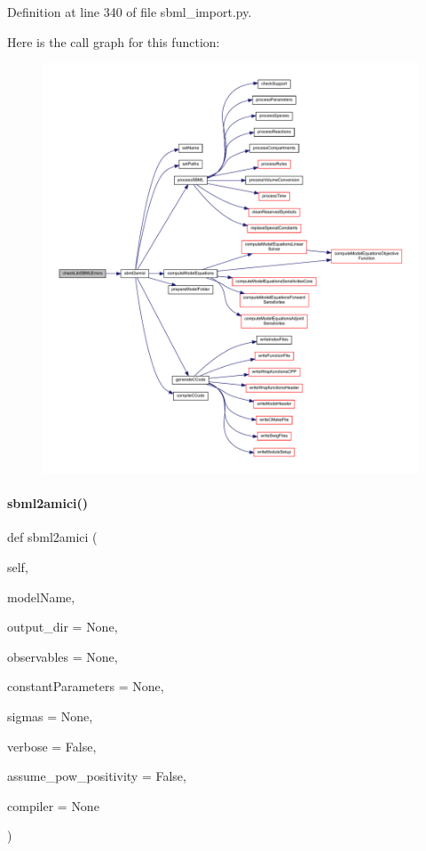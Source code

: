 Definition at line 340 of file sbml\+\_\+import.\+py.

Here is the call graph for this function\+:
\nopagebreak
\begin{figure}[H]
\begin{center}
\leavevmode
\includegraphics[width=350pt]{classamici_1_1sbml__import_1_1_sbml_importer_a0dcfa882a6a14f2d4b83e11552aae318_cgraph}
\end{center}
\end{figure}
\mbox{\label{classamici_1_1sbml__import_1_1_sbml_importer_a83900bb62c0121eb798939a6d4232a9c}} 
\paragraph{\texorpdfstring{sbml2amici()}{sbml2amici()}}
{\footnotesize\ttfamily def sbml2amici (\begin{DoxyParamCaption}\item[{}]{self,  }\item[{}]{model\+Name,  }\item[{}]{output\+\_\+dir = {\ttfamily None},  }\item[{}]{observables = {\ttfamily None},  }\item[{}]{constant\+Parameters = {\ttfamily None},  }\item[{}]{sigmas = {\ttfamily None},  }\item[{}]{verbose = {\ttfamily False},  }\item[{}]{assume\+\_\+pow\+\_\+positivity = {\ttfamily False},  }\item[{}]{compiler = {\ttfamily None} }\end{DoxyParamCaption})}


